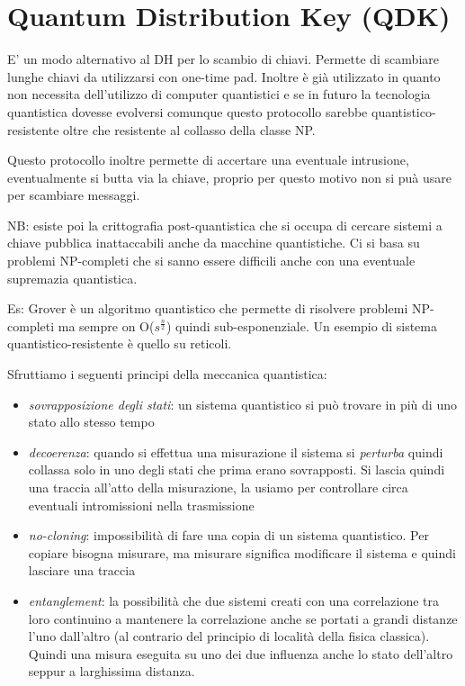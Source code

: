 \section{Quantum Distribution Key (QDK)}
E' un modo alternativo al DH per lo scambio di chiavi.
Permette di scambiare lunghe chiavi da utilizzarsi con one-time pad.
Inoltre è già utilizzato in quanto non necessita dell'utilizzo di computer quantistici e se in futuro la tecnologia quantistica dovesse evolversi comunque questo protocollo sarebbe quantistico-resistente oltre che resistente al collasso della classe NP.

Questo protocollo inoltre permette di accertare una eventuale intrusione, eventualmente si butta via la chiave, proprio per questo motivo non si puà usare per scambiare messaggi.

NB: esiste poi la crittografia post-quantistica che si occupa di cercare sistemi a chiave pubblica inattaccabili anche da macchine quantistiche.
Ci si basa su problemi NP-completi che si sanno essere difficili anche con una eventuale supremazia quantistica.

Es: Grover è un algoritmo quantistico che permette di risolvere problemi NP-completi ma sempre on O($s^{\frac{n}{2}}$) quindi sub-esponenziale.
Un esempio di sistema quantistico-resistente è quello su reticoli.

Sfruttiamo i seguenti principi della meccanica quantistica:
\begin{itemize}
    \item \emph{sovrapposizione degli stati}: un sistema quantistico si può trovare in più di uno stato allo stesso tempo
    \item \emph{decoerenza}: quando si effettua una misurazione il sistema si \emph{perturba} quindi collassa solo in uno degli stati che prima erano sovrapposti.
    Si lascia quindi una traccia all'atto della misurazione, la usiamo per controllare circa eventuali intromissioni nella trasmissione
    \item \emph{no-cloning}: impossibilità di fare una copia di un sistema quantistico.
    Per copiare bisogna misurare, ma misurare significa modificare il sistema e quindi lasciare una traccia
    \item \emph{entanglement}: la possibilità che due sistemi creati con una correlazione tra loro continuino a mantenere la correlazione anche se portati a grandi distanze l'uno dall'altro (al contrario del principio di località della fisica classica).
    Quindi una misura eseguita su uno dei due influenza anche lo stato dell'altro seppur a larghissima distanza.
\end{itemize}

